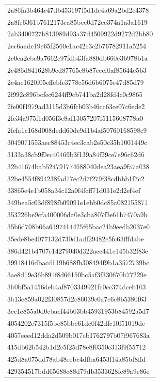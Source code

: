 \begin{tabular}{l}
2a86fa3b464e47db453197f5d1dc4a69a2bd2e4378 \\
2a8fc6361b7612173ca85bcc0d72cc374a1a3a1619 \\
2ab3400727b813989d93a37d4509922d9272d2bb80 \\
2cc6aade19e65f2560e1ac42c3c2b76782911a5254 \\
2e0ca2ebc9a7662c97fdb43fa880db660e3b978b1a \\
2e486d841628b9cd87765c8b87eecf0af85644e5b3 \\
2e4ae1620f05effebfe3778e56d6b6075e47d85d79 \\
2f992c896bcfec6244ff9cb741ba2d28fd4c0c9865 \\
2fe00f1979ad3115d3b6fcb03b46cc63ce07c6ede2 \\
2fe34a975f1d056f3e8af13057207f5115608778a0 \\
2fefa1c168d008dedd60de9d1b4af50760168598c9 \\
3049071553aec88453c4ec3cab2e50c35b1001449c \\
3133a38cb9f0ec40469b3f139a84f29ce7e96c62d6 \\
32b41674bab524791774688040dea23aea9fa7a038 \\
32be4554f894238fad17ec2d7f279f38cdbbb1f7c2 \\
33865e4e1b058a34c12a0f4fcff71d031e2d2ef4ef \\
349bea5c03df898fb09091e1ebb0dc85a082155871 \\
353226be9cfa400006da0e3cba807f3e61b7470a9b \\
35b6d708b66a6197414425f65bac21b9eedb2037e0 \\
35ede8be4077132d730d1adf29482e5fc63fffdabe \\
386d421b4707c14279040d322acc441e145b32f83e \\
39918416dbacd119b688fb308494f9b1a3572739bc \\
3ae8d19e36b891f8d66150bc5af3f330670b77229e \\
3b0bf5a1456deb4af8703349921fc0cc374dceb103 \\
3b13e859a022f30857d2e86039c0a7e6e8b5380f63 \\
3ec1c855a0d0ebacf44b03bb45931953b84592a5d7 \\
4054202e7315f5be85bbe61dc0f42dfc10f51019de \\
4057eeed12dda2d509b017eb1762797b07f967683a \\
415db62b542b1d2e5f25d78e8f0350c313f9f55712 \\
425d8a075dd78ab48eebc4dfba6453f14a85bf8ffd \\
429354517bdd65688c88d79db3533628fc89a9e86e \\

\end{tabular}

